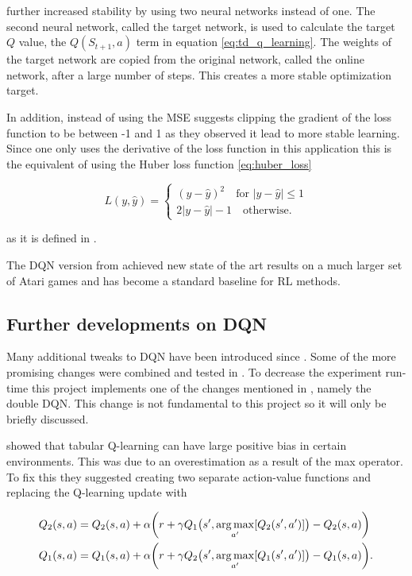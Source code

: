 \cite{mnih_2015} further increased stability by using two neural networks instead of one. The second neural network, called the target network, is used to calculate the target $Q$ value, the $Q(S_{t+1}, a)$ term in equation \ref{eq:td_q_learning}. The weights of the target network are copied from the original network, called the online network, after a large number of steps. This creates a more stable optimization target. 

In addition, instead of using the MSE \cite{mnih_2015} suggests clipping the gradient of the loss function to be between -1 and 1 as they observed it lead to more stable learning. Since one only uses the derivative of the loss function in this application this is the equivalent of using the Huber loss function \ref{eq:huber_loss}

\begin{equation}
    \label{eq:huber_loss}
    L(y, \hat{y}) = \begin{cases}
        (y-\hat{y})^2 \quad \text{for } |y-\hat{y}| \le 1 \\
        2|y-\hat{y}| - 1\quad \text{otherwise}.
    \end{cases}
\end{equation}

as it is defined in \citep[p.~349]{hastie_2009}.

The DQN version from \cite{mnih_2015} achieved new state of the art results on a much larger set of Atari games and has become a standard baseline for RL methods.

\subsection{Further developments on DQN}

Many additional tweaks to DQN have been introduced since \cite{mnih_2015}. Some of the more promising changes were combined and tested in \cite{hessel_2017}. To decrease the experiment run-time this project implements one of the changes mentioned in \cite{hessel_2017}, namely the double DQN.  This change is not fundamental to this project so it will only be briefly discussed.

\cite{hasselt_2010} showed that tabular Q-learning can have large positive bias in certain environments. This was due to an overestimation as a result of the max operator. To fix this they suggested creating two separate action-value functions and replacing the Q-learning update with 

\begin{equation}
    \begin{split}
    Q_2(s,a) &= Q_2(s,a) + \alpha\bigg(r + \gamma Q_1\big(s', \operatorname*{arg\,max}_{a'}[Q_2(s',a')]\big) - Q_2(s,a)\bigg) \\
    Q_1(s,a) &= Q_1(s,a) + \alpha\bigg(r + \gamma Q_2\big(s', \operatorname*{arg\,max}_{a'}[Q_1(s',a')]\big) - Q_1(s,a)\bigg).
    \end{split}
\end{equation}

